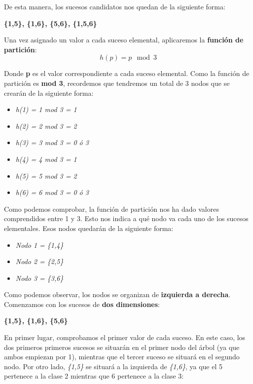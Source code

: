 \documentclass [a4paper] {article}
\begin{document}
De esta manera, los sucesos candidatos nos quedan de la siguiente forma:

\hfil \textbf{\{1,5\}, \{1,6\}, \{5,6\}, \{1,5,6\}} \par

Una vez asignado un valor a cada suceso elemental, aplicaremos la \textbf{función de partición}: \begin{equation*} h(p)=p\mod3 \end{equation*}

Donde \textbf{p} es el valor correspondiente a cada suceso elemental. Como la función de partición es \textbf{mod 3}, recordemos que tendremos un total de 3 nodos que se crearán de la siguiente forma:

\begin{center}
    \begin{itemize}
    	\item \textit{h(1) = 1 mod 3 = 1}
    	\item \textit{h(2) = 2 mod 3 = 2}
		\item \textit{h(3) = 3 mod 3 = 0 ó 3}
		\item \textit{h(4) = 4 mod 3 = 1}
		\item \textit{h(5) = 5 mod 3 = 2}
		\item \textit{h(6) = 6 mod 3 = 0 ó 3}
    \end{itemize}
\end{center}

Como podemos comprobar, la función de partición nos ha dado valores comprendidos entre 1 y 3. Esto nos indica a qué nodo va cada uno de los sucesos elementales. Esos nodos quedarán de la siguiente forma:

\begin{center}
    \begin{itemize}
    	\item \textit{Nodo 1 = \{1,4\}}
    	\item \textit{Nodo 2 = \{2,5\}}
		\item \textit{Nodo 3 = \{3,6\}}
    \end{itemize}
\end{center}

Como podemos observar, los nodos se organizan de \textbf{izquierda a derecha}. Comenzamos con los sucesos de \textbf{dos dimensiones}:

\hfil \textbf{\{1,5\}, \{1,6\}, \{5,6\}} \par

En primer lugar, comprobamos el primer valor de cada suceso. En este caso, los dos primeros primeros sucesos se situarán en el primer nodo del árbol (ya que ambos empiezan por 1), 
mientras que el tercer suceso se situará en el segundo nodo.  Por otro lado, \textit{\{1,5\}} se situará a la izquierda de \textit{\{1,6\}}, ya que el 5 pertenece a la clase 2 mientras
que 6 pertenece a la clase 3:
\end{document}
